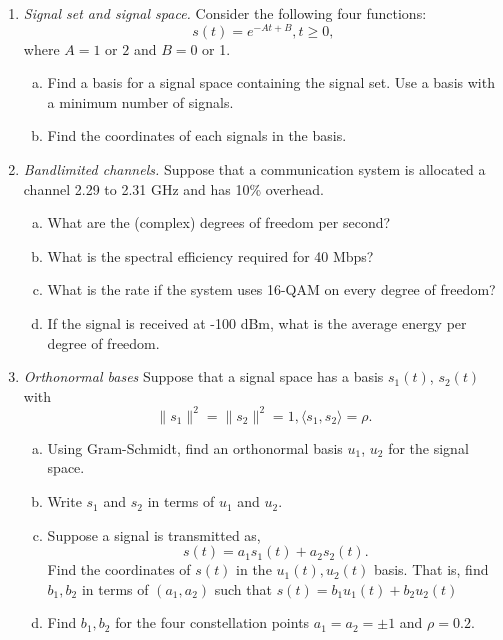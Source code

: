 \documentclass[11pt]{article}
\newcommand{\bkt}[1]{{\langle #1 \rangle}}
\begin{document}
\begin{enumerate}
\item \emph{Signal set and signal space.}  Consider the following four functions:
\[
    s(t) = e^{-At + B}, t \geq 0,
\]
where $A = 1$ or $2$ and $B=0$ or 1.
\begin{enumerate}[(a)]
\item Find a basis for a signal space containing the signal set.
Use a basis with a minimum number of signals.
\item Find the coordinates of each signals in the basis.
\end{enumerate}



\item \emph{Bandlimited channels.}  Suppose that a communication system is allocated
a channel 2.29 to 2.31 GHz and has 10\% overhead.
\begin{enumerate}[(a)]
\item What are the (complex) degrees of freedom per second?
\item What is the spectral efficiency required for 40 Mbps?
\item What is the rate if the system uses 16-QAM on every degree of freedom?
\item If the signal is received at -100 dBm, what is the average energy per degree of freedom.
\end{enumerate}



\item \emph{Orthonormal bases}  Suppose that a signal space has a basis $s_1(t)$, $s_2(t)$ with
\[
    \|s_1\|^2 = \|s_2\|^2 = 1, \bkt{s_1,s_2} = \rho.
\]
\begin{enumerate}[(a)]
\item Using Gram-Schmidt, find an orthonormal basis $u_1$, $u_2$ for the signal space.
\item Write $s_1$ and $s_2$ in terms of $u_1$ and $u_2$.
\item Suppose a signal is transmitted as,
\[
    s(t) = a_1 s_1(t) + a_2 s_2(t).
\]
Find the coordinates of $s(t)$ in the $u_1(t),u_2(t)$ basis.
That is, find $b_1,b_2$ in terms of $(a_1,a_2)$ such that $s(t) = b_1u_1(t) + b_2 u_2(t)$

\item Find $b_1,b_2$ for the four constellation points $a_1=a_2 = \pm 1$ and $\rho = 0.2$.
\end{enumerate}


\end{enumerate}
\end{document}
